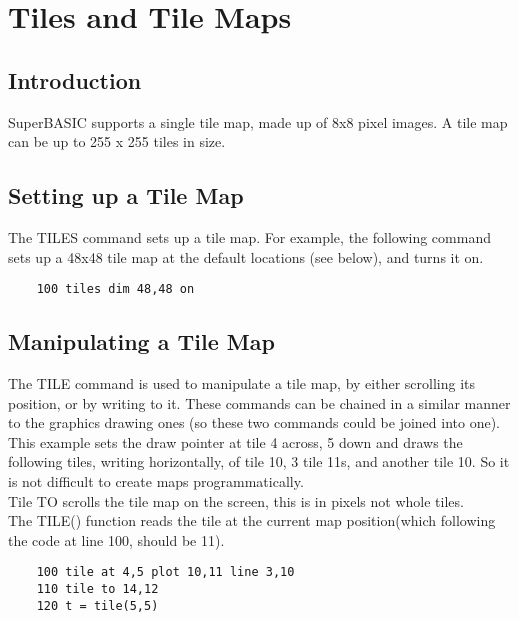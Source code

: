 \chapter{Tiles and Tile Maps}

\section{Introduction}

SuperBASIC supports a single tile map, made up of 8x8 pixel images. A tile map can be up to 255 x 255 tiles in size.

\section{Setting up a Tile Map}

The TILES command sets up a tile map. For example, the following command sets up a 48x48 tile map at the default locations (see below), and turns it on.

\begin{verbatim}
	100 tiles dim 48,48 on
\end{verbatim}

\section{Manipulating a Tile Map}

The TILE command is used to manipulate a tile map, by either scrolling its position, or by writing to it.  These commands can be chained in a similar manner to the graphics drawing ones (so these two commands could be joined into one).\\

This example sets the draw pointer at tile 4 across, 5 down and draws the following tiles, writing horizontally, of tile 10, 3 tile 11s, and another tile 10. So it is not difficult to create maps programmatically.\\

Tile TO scrolls the tile map on the screen, this is in pixels not whole tiles.\\

The TILE() function reads the tile at the current map position(which following the code at line 100, should be 11).

\begin{verbatim}
	100 tile at 4,5 plot 10,11 line 3,10
	110 tile to 14,12
	120 t = tile(5,5)
\end{verbatim}

